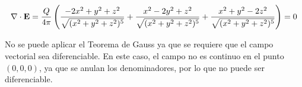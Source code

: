 \documentclass[11pt,a4paper]{article}
\begin{document}
\[
\nabla\cdot{\bf E}=\dfrac{Q}{4\pi}\left(\dfrac{-2x^2+y^2+z^2}{\sqrt{(x^2+y^2+z^2)^5}}+\dfrac{x^2-2y^2+z^2}{\sqrt{(x^2+y^2+z^2)^5}}+\dfrac{x^2+y^2-2z^2}{\sqrt{(x^2+y^2+z^2)^5}} \right)=0
\]


No se puede aplicar el Teorema de Gauss ya que se requiere que el campo vectorial sea diferenciable. En este caso, el campo no es continuo en el punto $(0,0,0)$, ya que se anulan los denominadores, por lo que no puede ser diferenciable.
\end{document}
